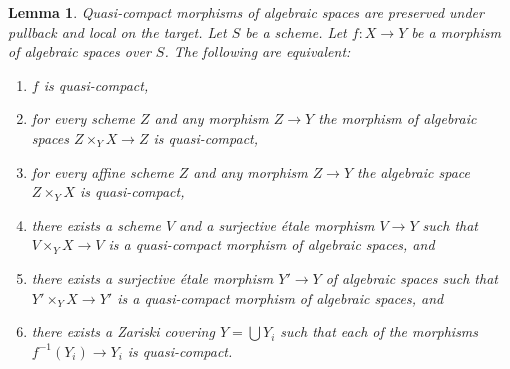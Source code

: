\documentclass{stacks-project}
\newenvironment{slogan}{\comment}{\endcomment}
\theoremstyle{plain}
\newtheorem{lemma}[subsection]{Lemma}
\theoremstyle{definition}
\theoremstyle{remark}
\numberwithin{equation}{subsection}
\begin{document}
\begin{lemma}
\label{lemma-quasi-compact-local}
\begin{slogan}
Quasi-compact morphisms of algebraic spaces are preserved under pullback
and local on the target.
\end{slogan}
Let $S$ be a scheme.
Let $f : X \to Y$ be a morphism of algebraic spaces over $S$.
The following are equivalent:
\begin{enumerate}
\item $f$ is quasi-compact,
\item for every scheme $Z$ and any morphism $Z \to Y$ the morphism of
algebraic spaces $Z \times_Y X \to Z$ is quasi-compact,
\item for every affine scheme $Z$ and any morphism
$Z \to Y$ the algebraic space $Z \times_Y X$ is quasi-compact,
\item there exists a scheme $V$ and a surjective \'etale morphism
$V \to Y$ such that $V \times_Y X \to V$ is a quasi-compact morphism
of algebraic spaces, and
\item there exists a surjective \'etale morphism
$Y' \to Y$ of algebraic spaces such that $Y' \times_Y X \to Y'$
is a quasi-compact morphism of algebraic spaces, and
\item there exists a Zariski covering $Y = \bigcup Y_i$ such that
each of the morphisms $f^{-1}(Y_i) \to Y_i$ is quasi-compact.
\end{enumerate}
\end{lemma}
\end{document}
